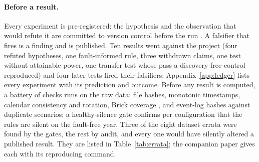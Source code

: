 \documentclass[11pt,letterpaper]{article}
\begin{document}
\paragraph{Before a result.} Every experiment is pre-registered: the hypothesis and the observation that would refute it are committed to version control before the run \cite{nosek2018preregistration,pitsch2025hypothesistesting}. A falsifier that fires is a finding and is published. Ten results went against the project (four refuted hypotheses, one fault-informed rule, three withdrawn claims, one test without attainable power, one transfer test whose pass a discovery-free control reproduced) and four later tests fired their falsifiers; Appendix~\ref{app:ledger} lists every experiment with its prediction and outcome. Before any result is computed, a battery of checks runs on the raw data: file hashes, monotonic timestamps, calendar consistency and rotation, Brick coverage \cite{balaji2016brick}, and event-log hashes against duplicate scenarios; a healthy-silence gate confirms per configuration that the rules are silent on the fault-free year. Three of the eight dataset errata were found by the gates, the rest by audit, and every one would have silently altered a published result. They are listed in Table~\ref{tab:errata}; the companion paper \cite{singh2027erratacompanion} gives each with its reproducing command.
\end{document}
